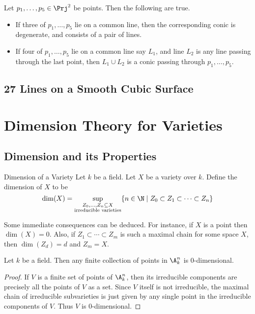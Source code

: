 \documentclass[a4paper]{article}
\begin{document}
\begin{prp}{}{} Let $p_1,\dots,p_5\in\Prj^2$ be points. Then the following are true. 
\begin{itemize}
\item If three of $p_1,\dots,p_5$ lie on a common line, then the corresponding conic is degenerate, and consists of a pair of lines. 
\item If four of $p_1,\dots,p_5$ lie on a common line say $L_1$, and line $L_2$ is any line passing through the last point, then $L_1\cup L_2$ is a conic passing through $p_1,\dots,p_5$. 
\end{itemize}
\end{prp}

\subsection{27 Lines on a Smooth Cubic Surface}

\pagebreak
\section{Dimension Theory for Varieties}
\subsection{Dimension and its Properties}
\begin{defn}{Dimension of a Variety}{} Let $k$ be a field. Let $X$ be a variety over $k$. Define the dimension of $X$ to be $$\dim(X)=\sup_{\substack{Z_0,\dots,Z_n\subseteq X\\\text{irreducible varieties}}}\{n\in\N\;|\;Z_0\subset Z_1\subset\dots\subset Z_n\}$$
\end{defn}

Some immediate consequences can be deduced. For instance, if $X$ is a point then $\dim(X)=0$. Also, if $Z_1\subset\cdots\subset Z_m$ is such a maximal chain for some space $X$, then $\dim(Z_d)=d$ and $Z_m=X$. 

\begin{eg}{}{} Let $k$ be a field. Then any finite collection of points in $\A_k^n$ is $0$-dimensional. \tcbline
\begin{proof}
If $V$ is a finite set of points of $\A_k^n$, then its irreducible components are precisely all the points of $V$ as a set. Since $V$ itself is not irreducible, the maximal chain of irreducible subvarieties is just given by any single point in the irreducible components of $V$. Thus $V$ is $0$-dimensional. 
\end{proof}
\end{eg}
\end{document}
